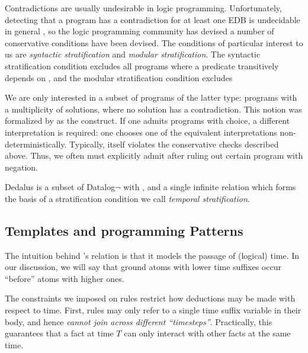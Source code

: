 Contradictions are usually undesirable in logic programming.  Unfortunately, detecting that a program has a contradiction for at least one EDB is undecidable in general , so the logic programming community has devised a number of conservative conditions have been devised.  The conditions of particular interest to us are {\em syntactic stratification} and {\em modular stratification}.  The syntactic stratification condition excludes all programs where a predicate  transitively depends on , and the modular stratification condition excludes 


We are only interested in a subset of programs of the latter type: programs with a multiplicity of solutions, where no solution has a contradiction.  This notion was formalized by  as the  construct.  If one admits programs with choice, a different interpretation is required: one chooses one of the equivalent interpretations non-deterministically.  Typically,  itself violates the conservative checks described above.  Thus, we often must explicitly admit  after ruling out certain program with negation.


Dedalus is a subset of Datalog$\lnot$ with , and a single infinite relation  which forms the basis of a stratification condition we call {\em temporal stratification}.  


\subsection{Templates and programming Patterns}

The intuition behind \lang's  relation is that it models the
passage of (logical) time.  In our discussion, we will say that ground atoms
with lower time suffixes occur ``before'' atoms with higher ones.

The constraints we imposed on \slang rules restrict how deductions may be made
with respect to time.  First, rules may only refer to a single time suffix variable in
their body, and hence {\em cannot join across different ``timesteps''}.  Practically, this guarantees that a fact at time $T$ can only interact with other facts at the same time.

